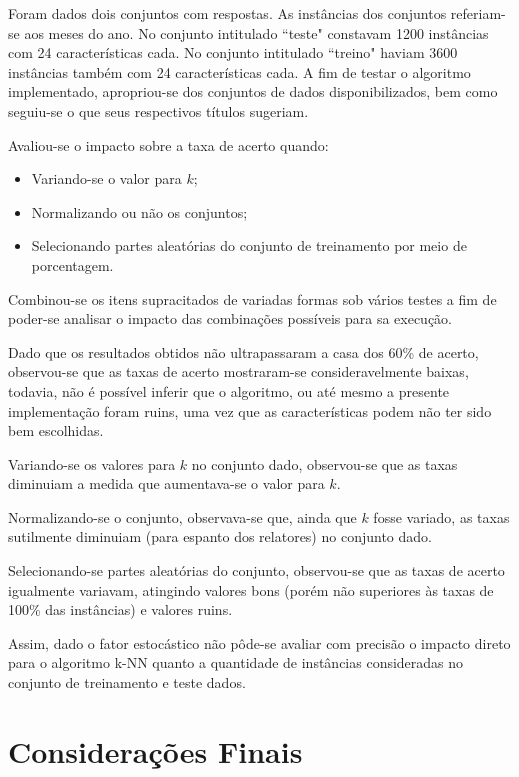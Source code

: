 \documentclass[12pt]{article}
\begin{document}
		Foram dados dois conjuntos com respostas. As instâncias dos conjuntos referiam-se aos meses do ano. No conjunto intitulado ``teste" constavam 1200 instâncias com 24 características cada. No conjunto intitulado ``treino" haviam 3600 instâncias também com 24 características cada. A fim de testar o algoritmo implementado, apropriou-se dos conjuntos de dados disponibilizados, bem como seguiu-se o que seus respectivos títulos sugeriam.

		Avaliou-se o impacto sobre a taxa de acerto quando:

		\begin{itemize}
			\item Variando-se o valor para $k$;
			\item Normalizando ou não os conjuntos;
			\item Selecionando partes aleatórias do conjunto de treinamento por meio de porcentagem.
		\end{itemize}

		Combinou-se os itens supracitados de variadas formas sob vários testes a fim de poder-se analisar o impacto das combinações possíveis para sa execução.
		
		Dado que os resultados obtidos não ultrapassaram a casa dos 60\% de acerto, observou-se que as taxas de acerto 
		mostraram-se consideravelmente baixas, todavia, não é possível inferir que o algoritmo, ou até mesmo a presente implementação foram ruins, uma vez que as características podem não ter sido bem escolhidas.

		Variando-se os valores para $k$ no conjunto dado, observou-se que as taxas diminuiam a medida que aumentava-se o valor para $k$.

		Normalizando-se o conjunto, observava-se que, ainda que $k$ fosse variado, as taxas sutilmente diminuiam (para espanto dos relatores) no conjunto dado.

		Selecionando-se partes aleatórias do conjunto, observou-se que as taxas de acerto igualmente variavam, atingindo valores bons (porém não superiores às taxas de 100\% das instâncias) e valores ruins.

		Assim, dado o fator estocástico não pôde-se avaliar com precisão o impacto direto para o algoritmo k-NN quanto a quantidade de instâncias consideradas no conjunto de treinamento e teste dados.

	\section{Considerações Finais}\label{sec:consideracoesFinais}
\end{document}
